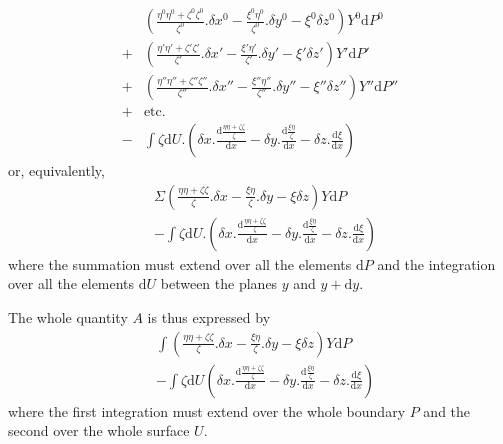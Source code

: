 \[
\begin{aligned}
&(\frac{\eta^0\eta^0+\zeta^0\zeta^0}{\zeta^0}.\delta x^0-\frac{\xi^0\eta^0}{\zeta^0}.\delta y^0-\xi^0\delta z^0)Y^0\mathrm{d}P^0\\
+&(\frac{\eta'\eta'+\zeta'\zeta'}{\zeta'}.\delta x'-\frac{\xi'\eta'}{\zeta'}.\delta y'-\xi'\delta z')Y'\mathrm{d}P'\\
+&(\frac{\eta''\eta''+\zeta''\zeta''}{\zeta''}.\delta x''-\frac{\xi''\eta''}{\zeta''}.\delta y''-\xi''\delta z'')Y''\mathrm{d}P''\\
+&\text{etc.}\\
-&\int\zeta\mathrm{d}U.(\delta x.\frac{\mathrm{d}\frac{\eta\eta+\zeta\zeta}{\zeta}}{\mathrm{d}x}-\delta y.\frac{\mathrm{d}\frac{\xi\eta}{\zeta}}{\mathrm{d}x}-\delta z.\frac{\mathrm{d}\xi}{\mathrm{d}x})
\end{aligned}
\]
or, equivalently,
\[
\begin{aligned}
&\Sigma(\frac{\eta\eta+\zeta\zeta}{\zeta}.\delta x-\frac{\xi\eta}{\zeta}.\delta y-\xi\delta z)Y\mathrm{d}P\\
&-\int\zeta\mathrm{d}U.(\delta x.\frac{\mathrm{d}\frac{\eta\eta+\zeta\zeta}{\zeta}}{\mathrm{d}x}-\delta y.\frac{\mathrm{d}\frac{\xi\eta}{\zeta}}{\mathrm{d}x}-\delta z.\frac{\mathrm{d}\xi}{\mathrm{d}x})
\end{aligned}
\]
where the summation must extend over all the elements $\mathrm{d}P$ and the integration over all the elements $\mathrm{d}U$ between the planes $y$ and $y+\mathrm{d}y$.

The whole quantity $A$ is thus expressed by
\[
\begin{aligned}
&\int(\frac{\eta\eta+\zeta\zeta}{\zeta}.\delta x-\frac{\xi\eta}{\zeta}.\delta y-\xi\delta z)Y\mathrm{d}P\\
&-\int\zeta\mathrm{d}U(\delta x.\frac{\mathrm{d}\frac{\eta\eta+\zeta\zeta}{\zeta}}{\mathrm{d}x}-\delta y.\frac{\mathrm{d}\frac{\xi\eta}{\zeta}}{\mathrm{d}x}-\delta z.\frac{\mathrm{d}\xi}{\mathrm{d}x})
\end{aligned}
\]
where the first integration must extend over the whole boundary $P$ and the second over the whole surface $U$.

